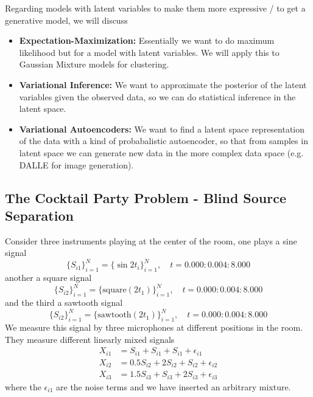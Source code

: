 Regarding models with latent variables to make them more expressive / to
get a generative model, we will discuss

\begin{itemize}
    \item \textbf{Expectation-Maximization:} Essentially we want to do maximum likelihood but for a model with latent variables. We will apply this to Gaussian Mixture models for clustering.
    \item \textbf{Variational Inference:} We want to approximate the posterior of the latent variables given the observed data, so we can do statistical inference in the latent space.
    \item \textbf{Variational Autoencoders:} We want to find a latent space representation of the data with a kind of probabalistic autoencoder,
          so that from samples in latent space we can generate new data in the more complex data space (e.g. DALLE for image generation).
\end{itemize}

\subsection{The Cocktail Party Problem - Blind Source Separation}
Consider three instruments playing at the center of the room, one plays a sine signal
\begin{equation}
    \{S_{i1}\}_{i=1}^N = \{ \sin 2t_i \}_{i=1}^N, \quad t = 0.000:0.004:8.000
\end{equation}
another a square signal
\begin{equation}
    \{S_{i2}\}_{i=1}^N = \{ \text{square}(2t_1) \}_{i=1}^N, \quad t = 0.000:0.004:8.000
\end{equation}
and the third a sawtooth signal
\begin{equation}
    \{S_{i2}\}_{i=1}^N = \{ \text{sawtooth}(2t_1) \}_{i=1}^N, \quad t = 0.000:0.004:8.000
\end{equation}
We measure this signal by three microphones at different positions in the room. They measure different
linearly mixed signals
\begin{equation}
    \begin{aligned}
        X_{i1} &= S_{i1} + S_{i1} + S_{i1} + \epsilon_{i1} \\
        X_{i2} &= 0.5 S_{i2} + 2 S_{i2} + S_{i2} + \epsilon_{i2} \\
        X_{i3} &= 1.5 S_{i3} + S_{i3} + 2 S_{i3} + \epsilon_{i3}
    \end{aligned}
\end{equation}
where the $\epsilon_{i1}$ are the noise terms and we have inserted an arbitrary mixture.


